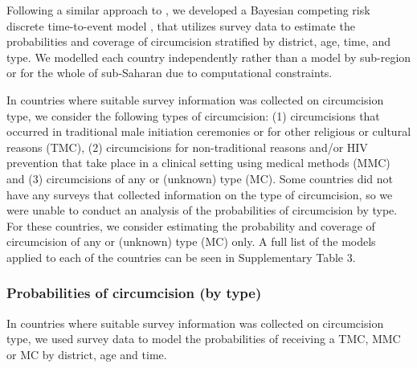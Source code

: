 \documentclass{article}
\begin{document}
Following a similar approach to \cite{thomas2024substantial}, we developed a Bayesian competing risk discrete time-to-event model \cite{putter2006tutorial}, that utilizes survey data to estimate the probabilities and coverage of circumcision stratified by district, age, time, and type. We modelled each country independently rather than a model by sub-region or for the whole of sub-Saharan due to computational constraints.

In countries where suitable survey information was collected on circumcision type, we consider the following types of circumcision: (1) circumcisions that occurred in traditional male initiation ceremonies or for other religious or cultural reasons (TMC), (2) circumcisions for non-traditional reasons and/or HIV prevention that take place in a clinical setting using medical methods (MMC) and (3) circumcisions of any or (unknown) type (MC). Some countries did not have any surveys that collected information on the type of circumcision, so we were unable to conduct an analysis of the probabilities of circumcision by type. For these countries, we consider estimating the probability and coverage of circumcision of any or (unknown) type (MC) only. A full list of the models applied to each of the countries can be seen in Supplementary Table 3. 


\subsubsection*{Probabilities of circumcision (by type)}
\label{sec::bytype}


In countries where suitable survey information was collected on circumcision type, we used survey data to model the probabilities of receiving a TMC, MMC or MC by district, age and time.  
\end{document}
